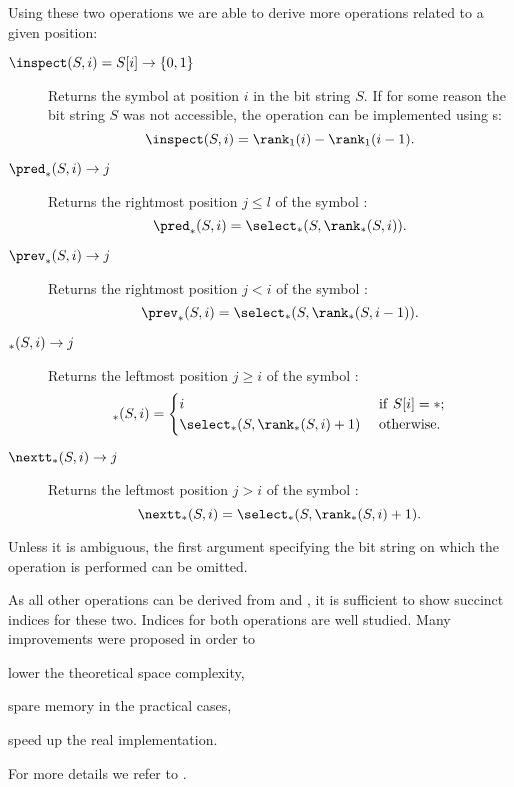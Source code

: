 Using these two operations we are able to derive more operations related to a given position:
\begin{description}
	\item[$\inspect(S, i) = S[i\char93 \rightarrow \{0, 1\}$]
	Returns the symbol at position $i$ in the bit string $S$.
	If for some reason the bit string $S$ was not accessible, the operation can be implemented using \rank{}s:
	$$ \inspect(S, i) = \rank_1(i) - \rank_1(i - 1). $$

	\item[$\pred_{\ph}(S, i) \rightarrow j$]
	Returns the rightmost position $j \le l$ of the symbol \ph{}:
	$$ \pred_{\ph}(S, i) = \select_{\ph}(S, \rank_{\ph}(S, i)). $$
	
	\item[$\prev_{\ph}(S, i) \rightarrow j$]
	Returns the rightmost position $j < i$ of the symbol \ph{}:
	$$ \prev_{\ph}(S, i) = \select_{\ph}(S, \rank_{\ph}(S, i - 1)). $$

	\item[$\succ_{\ph}(S, i) \rightarrow j$]
	Returns the leftmost position $j \ge i$ of the symbol \ph{}:
	$$ \succ_{\ph}(S, i) = \begin{cases}
		i & \textif S[i] = \ph; \\
		\select_{\ph}(S, \rank_{\ph}(S, i) + 1) & \textotherwise.
	\end{cases} $$

	\item[$\nextt_{\ph}(S, i) \rightarrow j$]
	Returns the leftmost position $j > i$ of the symbol \ph{}:
	$$ \nextt_{\ph}(S, i) = \select_{\ph}(S, \rank_{\ph}(S, i) + 1).$$
\end{description}

Unless it is ambiguous, the first argument specifying the bit string on which the operation is performed can be omitted.

\bigbreak

As all other operations can be derived from \rank{} and \select{}, it is sufficient to show succinct indices for these two.
Indices for both operations are well studied.
Many improvements were proposed in order to
\begin{iteminline}
	\item lower the theoretical space complexity,
	\item spare memory in the practical cases,
	\item speed up the real implementation.
\end{iteminline}
For more details we refer to \cite{gonzalez2005practical, kim2005efficient, makinen2007rank}.

